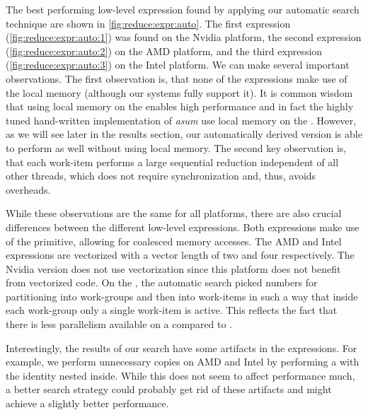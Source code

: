 The best performing low-level expression found by applying our automatic search technique are shown in \autoref{fig:reduce:expr:auto}.
The first expression (\autoref{fig:reduce:expr:auto:1}) was found on the Nvidia platform, the second expression (\autoref{fig:reduce:expr:auto:2}) on the AMD platform, and the third expression (\autoref{fig:reduce:expr:auto:3}) on the Intel platform.
We can make several important observations.
The first observation is, that none of the expressions make use of the local memory (although our systems fully support it).
It is common wisdom that using local memory on the \GPU enables high performance and in fact the highly tuned hand-written implementation of \textit{asum} use local memory on the \GPU.
However, as we will see later in the results section, our automatically derived version is able to perform as well without using local memory.
The second key observation is, that each work-item performs a large sequential reduction independent of all other threads, which does not require synchronization and, thus, avoids overheads.

While these observations are the same for all platforms, there are also crucial differences between the different low-level expressions.
Both \GPU expressions make use of the \reorderStride primitive, allowing for coalesced memory accesses.
The AMD and Intel expressions are vectorized with a vector length of two and four respectively.
The Nvidia version does not use vectorization since this platform does not benefit from vectorized code.
On the \CPU, the automatic search picked numbers for partitioning into work-groups and then into work-items in such a way that inside each work-group only a single work-item is active.
This reflects the fact that there is less parallelism available on a \CPU compared to \GPUs.

Interestingly, the results of our search have some artifacts in the expressions.
For example, we perform unnecessary copies on AMD and Intel by performing a \mapSeq with the identity nested inside.
While this does not seem to affect performance much, a better search strategy could probably get rid of these artifacts and might achieve a slightly better performance.


